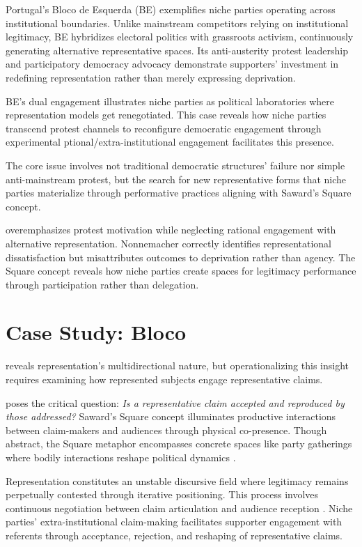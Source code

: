 \begin{tcolorbox}
Portugal's Bloco de Esquerda (BE) exemplifies niche parties operating across institutional boundaries. Unlike mainstream competitors relying on institutional legitimacy, BE hybridizes electoral politics with grassroots activism, continuously generating alternative representative spaces. Its anti-austerity protest leadership and participatory democracy advocacy demonstrate supporters' investment in redefining representation rather than merely expressing deprivation.

BE's dual engagement illustrates niche parties as political laboratories where representation models get renegotiated. This case reveals how niche parties transcend protest channels to reconfigure democratic engagement through experimental ptional/extra-institutional engagement facilitates this presence.

 The core issue involves not traditional democratic structures' failure nor simple anti-mainstream protest, but the search for new representative forms that niche parties materialize through performative practices aligning with Saward's Square concept.

\textcite{stiers2024} overemphasizes protest motivation while neglecting rational engagement with alternative representation. Nonnemacher correctly identifies representational dissatisfaction but misattributes outcomes to deprivation rather than agency. The Square concept reveals how niche parties create spaces for legitimacy performance through participation rather than delegation.

\chapter{Case Study: Bloco}
\parencite{disch2015} reveals representation's multidirectional nature, but operationalizing this insight requires examining how represented subjects engage representative claims.

\textcite{kim2024} poses the critical question: \textit{Is a representative claim accepted and reproduced by those addressed?} Saward's Square concept illuminates productive interactions between claim-makers and audiences through physical co-presence. Though abstract, the Square metaphor encompasses concrete spaces like party gatherings where bodily interactions reshape political dynamics \parencite{kim2024}.

Representation constitutes an unstable discursive field where legitimacy remains perpetually contested through iterative positioning. This process involves continuous negotiation between claim articulation and audience reception \parencite{kim2024}. Niche parties' extra-institutional claim-making \parencite{kim2024} facilitates supporter engagement with referents through acceptance, rejection, and reshaping of representative claims.


\end{tcolorbox}
